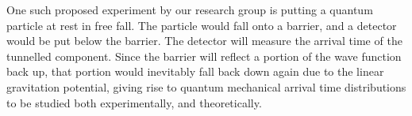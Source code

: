 One such proposed experiment by our research group is putting a quantum particle at rest in free fall. The particle would fall onto a barrier, and a detector would be put below the barrier. The detector will measure the arrival time of the tunnelled component. Since the barrier will reflect a portion of the wave function back up, that portion would inevitably fall back down again due to the linear gravitation potential, giving rise to quantum mechanical arrival time distributions to be studied both experimentally, and theoretically.
\\\\

